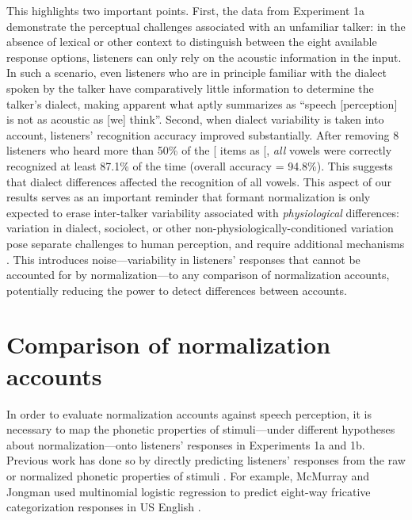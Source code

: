 \documentclass[preprint]{JASA}
\begin{document}
This highlights two important points. First, the data from Experiment 1a demonstrate the perceptual challenges associated with an unfamiliar talker: in the absence of lexical or other context to distinguish between the eight available response options, listeners can only rely on the acoustic information in the input. In such a scenario, even listeners who are in principle familiar with the dialect spoken by the talker have comparatively little information to determine the talker's dialect, making apparent what \citet{winn2018} aptly summarizes as ``speech {[}perception{]} is not as acoustic as {[}we{]} think''. Second, when dialect variability is taken into account, listeners' recognition accuracy improved substantially. After removing 8 listeners who heard more than 50\% of the {[}\textipa{I}{]} items as {[}\textipa{E}{]}, \emph{all} vowels were correctly recognized at least 87.1\% of the time (overall accuracy = 94.8\%). This suggests that dialect differences affected the recognition of all vowels. This aspect of our results serves as an important reminder that formant normalization is only expected to erase inter-talker variability associated with \emph{physiological} differences: variation in dialect, sociolect, or other non-physiologically-conditioned variation pose separate challenges to human perception, and require additional mechanisms \citep[see discussion in][]{barreda2021, weatherholtz-jaeger2016}. This introduces noise---variability in listeners' responses that cannot be accounted for by normalization---to any comparison of normalization accounts, potentially reducing the power to detect differences between accounts.

\section{Comparison of normalization accounts}\label{comparison-of-normalization-accounts}

In order to evaluate normalization accounts against speech perception, it is necessary to map the phonetic properties of stimuli---under different hypotheses about normalization---onto listeners' responses in Experiments 1a and 1b. Previous work has done so by directly predicting listeners' responses from the raw or normalized phonetic properties of stimuli \citep{apfelbaum-mcmurray2015, barreda2021, crinnion2020, mcmurray-jongman2011, nearey1989}. For example, McMurray and Jongman used multinomial logistic regression to predict eight-way fricative categorization responses in US English \citep[see also][]{barreda2021}.
\end{document}

